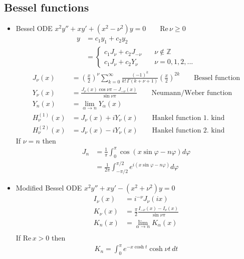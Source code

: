 \documentclass[10pt,a4paper]{book}
\theoremstyle{definition}
\begin{document}
\subsection{Bessel functions}
\begin{itemize}
\item Bessel ODE $x^2y''+xy'+(x^2-\nu^2)y=0\qquad \text{Re}\,\nu\ge0$
\begin{align}
y&=c_1y_1+c_2y_2\\
&=\left\{\begin{array}{ll}
c_1J_\nu+c_2J_{-\nu} &  \quad\nu\notin\mathbb{Z}\\
c_1J_\nu+c_2Y_{\nu}  &  \quad\nu=0,1,2,...
\end{array}\right.
\end{align}
\begin{align}
J_\nu(x)&=\left(\frac{x}{2}\right)^\nu\sum_{k=0}^\infty\frac{(-1)^k}{k!\,\Gamma(k+\nu+1)}\left(\frac{x}{2}\right)^{2k}\qquad\text{Bessel function}\\
Y_\nu(x)&=\frac{J_\nu(x)\cos\nu\pi-J_{-\nu}(x)}{\sin\nu\pi}\qquad\text{Neumann/Weber function}\\
Y_n(x)&=\lim_{\alpha\rightarrow n}Y_{\alpha}(x)\\
H_\nu^{(1)}(x)&=J_\nu(x)+iY_\nu(x)\qquad\text{Hankel function 1. kind}\\
H_\nu^{(2)}(x)&=J_\nu(x)-iY_\nu(x)\qquad\text{Hankel function 2. kind}
\end{align}
If $\nu=n$ then 
\begin{align}
J_n
&=\frac{1}{\pi}\int_0^\pi\cos(x\sin\varphi-n\varphi)d\varphi\\
&=\frac{1}{2\pi}\int_{-\pi/2}^{\pi/2}e^{i(x\sin\varphi-n\varphi)}d\varphi
\end{align}

\item Modified Bessel ODE $x^2y''+xy'-(x^2+\nu^2)y=0$
\begin{align}
I_\nu(x)&=i^{-\nu}J_\nu(ix)\\
K_\nu(x)&=\frac{\pi}{2}\frac{I_{-\nu}(x)-I_{\nu}(x)}{\sin\nu\pi}\\
K_n(x)&=\lim_{\alpha\rightarrow n}K_{\alpha}(x)\\
\end{align}
If $\text{Re}\,x>0$ then 
\begin{align}
K_n=\int_0^\pi e^{-x\cosh t}\cosh\nu t\,dt
\end{align}

\end{itemize}
\end{document}
